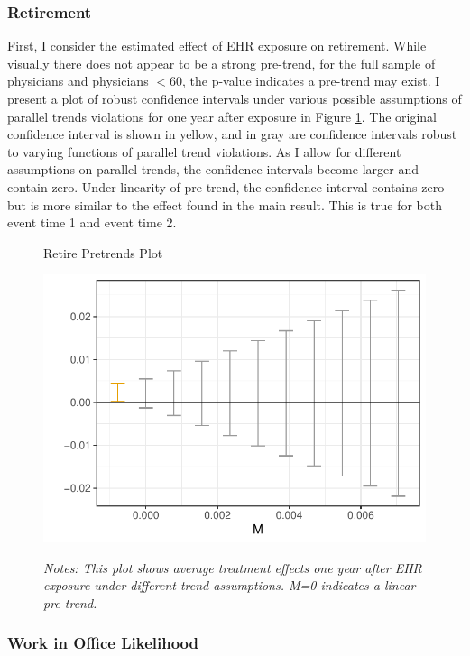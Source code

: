 \documentclass[12pt]{article}
\begin{document}
\subsubsection{Retirement} 

First, I consider the estimated effect of EHR exposure on retirement. While visually there does not appear to be a strong pre-trend, for the full sample of physicians and physicians $< 60$, the p-value indicates a pre-trend may exist. I present a plot of robust confidence intervals under various possible assumptions of parallel trends violations for one year after exposure in Figure \ref{fig:pre_retire}. The original confidence interval is shown in yellow, and in gray are confidence intervals robust to varying functions of parallel trend violations. As I allow for different assumptions on parallel trends, the confidence intervals become larger and contain zero. Under linearity of pre-trend, the confidence interval contains zero but is more similar to the effect found in the main result. This is true for both event time 1 and event time 2. 

\begin{figure}[ht]
    \centering
    \captionsetup{width=.5\linewidth}
    \caption{Retire Pretrends Plot}
    \includegraphics[scale=.5]{Objects/retire_pretrends_plot.pdf}
    \label{fig:pre_retire}
    \vspace{2mm}
    \caption*{\footnotesize{\textit{Notes: This plot shows average treatment effects one year after EHR exposure under different trend assumptions. M=0 indicates a linear pre-trend.}}}
\end{figure}

\subsubsection{Work in Office Likelihood}
\end{document}
